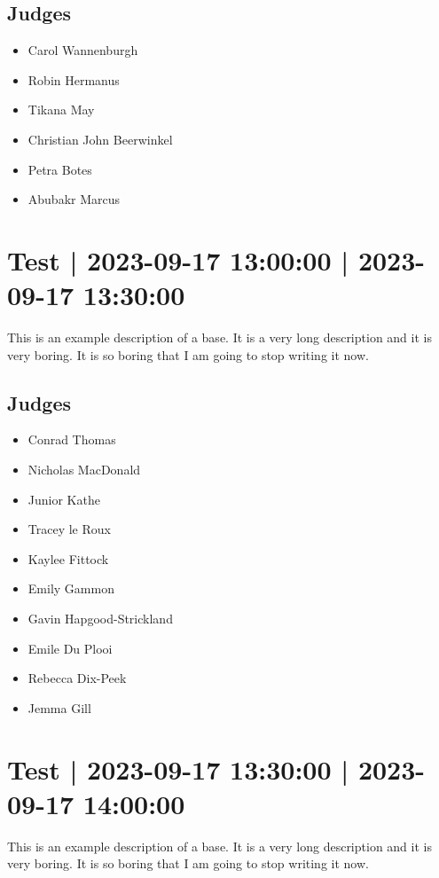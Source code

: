 \documentclass[10pt]{article}
\begin{document}
	\subsection*{Judges}
	\begin{itemize}

			\item Carol Wannenburgh
			\item Robin Hermanus
			\item Tikana May
			\item Christian John Beerwinkel
			\item Petra Botes
			\item Abubakr Marcus
		\end{itemize}

			\setcounter{section}{47}
	\section{Test | 2023-09-17 13:00:00 | 2023-09-17 13:30:00}
	This is an example description of a base. It is a very long description and it is very boring. It is so boring that I am going to stop writing it now.

	\subsection*{Judges}
	\begin{itemize}

			\item Conrad Thomas
			\item Nicholas MacDonald
			\item Junior Kathe
			\item Tracey le Roux
			\item Kaylee Fittock
			\item Emily Gammon
			\item Gavin Hapgood-Strickland
			\item Emile Du Plooi
			\item Rebecca Dix-Peek
			\item Jemma Gill
		\end{itemize}

			\setcounter{section}{48}
	\section{Test | 2023-09-17 13:30:00 | 2023-09-17 14:00:00}
	This is an example description of a base. It is a very long description and it is very boring. It is so boring that I am going to stop writing it now.
\end{document}
